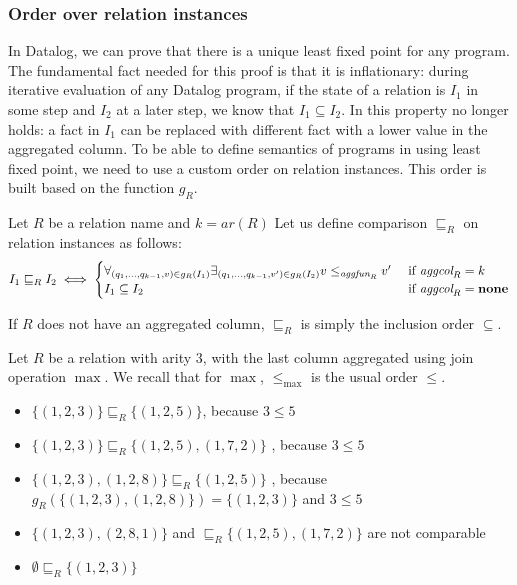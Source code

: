 \subsubsection{Order over relation instances}
In Datalog, we can prove that there is a unique least fixed point for any program. The fundamental fact needed for this proof is that it is inflationary: during iterative evaluation of any Datalog program, if the state of a relation is $I_1$ in some step and $I_2$ at a later step, we know that $I_1 \subseteq I_2$. In \datalogra this property no longer holds: a fact in $I_1$ can be replaced with different fact with a lower value in the aggregated column. To be able to define semantics of programs in \datalogra using least fixed point, we need to use a custom order on relation instances. This order is built based on the function $g_R$.

\begin{defn}
Let $R$ be a relation name and $k=ar(R)$ Let us define comparison $\sqsubseteq_R$ on relation instances as follows:
$$
I_1 \sqsubseteq_R I_2 \iff
\begin{cases}
   \forall_{(q_1, ..., q_{k-1}, v) \in g_R(I_1)} \exists_{(q_1, ..., q_{k-1}, v') \in g_R(I_2)} v \le_{\textit{aggfun}_R} v' & \text{ if } \textit{aggcol}_R = k \\
   I_1 \subseteq I_2 & \text{ if } \textit{aggcol}_R = \bf{none} 
\end{cases}
$$
\end{defn}

\begin{rem}
If $R$ does not have an aggregated column, $\sqsubseteq_R$ is simply the inclusion order $\subseteq$. 
\end{rem}


\begin{exmp}
Let $R$ be a relation with arity $3$, with the last column aggregated using join operation $\max$.
We recall that for $ \max $, $ \le_{\max} $ is the usual order $ \le $.
\begin{itemize}
\item $\{(1, 2, 3)\} \sqsubseteq_R \{(1, 2, 5)\}$, because $3 \le 5$
\item $\{(1, 2, 3)\} \sqsubseteq_R \{(1, 2, 5), (1, 7, 2)\}$ , because $3 \le 5$
\item $\{(1, 2, 3), (1, 2, 8)\} \sqsubseteq_R \{(1, 2, 5)\}$ , because $g_R(\{(1, 2, 3), (1, 2, 8)\}) = \{(1,2,3)\}$ and $3 \le 5$
\item $\{(1, 2, 3), (2, 8, 1)\}$ and  $\sqsubseteq_R \{(1, 2, 5), (1, 7, 2)\}$ are not comparable
\item $\emptyset \sqsubseteq_R \{(1, 2, 3)\}$
\end{itemize}
\end{exmp}\label{ex:sqsubseteqorder}

